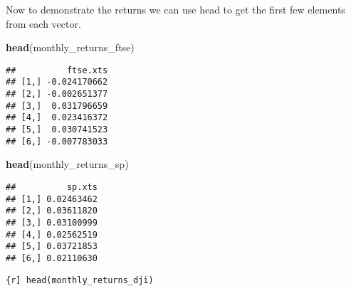 \documentclass[
]{article}
\newenvironment{Shaded}{\begin{snugshade}}{\end{snugshade}}
\newcommand{\FunctionTok}[1]{\textcolor[rgb]{0.13,0.29,0.53}{\textbf{#1}}}
\newcommand{\NormalTok}[1]{#1}
\begin{document}
Now to demonstrate the returns we can use head to get the first few
elements from each vector.

\begin{Shaded}
\begin{Highlighting}[]
\FunctionTok{head}\NormalTok{(monthly\_returns\_ftse)}
\end{Highlighting}
\end{Shaded}

\begin{verbatim}
##          ftse.xts
## [1,] -0.024170662
## [2,] -0.002651377
## [3,]  0.031796659
## [4,]  0.023416372
## [5,]  0.030741523
## [6,] -0.007783033
\end{verbatim}

\begin{Shaded}
\begin{Highlighting}[]
\FunctionTok{head}\NormalTok{(monthly\_returns\_sp)}
\end{Highlighting}
\end{Shaded}

\begin{verbatim}
##          sp.xts
## [1,] 0.02463462
## [2,] 0.03611820
## [3,] 0.03100999
## [4,] 0.02562519
## [5,] 0.03721853
## [6,] 0.02110630
\end{verbatim}

\texttt{\{r{]}\ head(monthly\_returns\_dji)}
\end{document}
